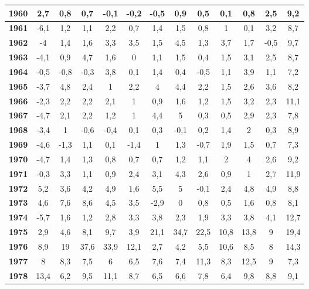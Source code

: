 \begin{center}
\begin{scriptsize}
\begin{longtable}{|c|c|c|c|c|c|c|c|c|c|c|c|c|}
\hline 
\textbf{1960} & 2,7 & 0,8 & 0,7 & -0,1 & -0,2 & -0,5 & 0,9 & 0,5 & 0,1 & 0,8 & 2,5 & 9,2  \\ 
\hline 
\textbf{1961} & -6,1 & 1,2 & 1,1 & 2,2 & 0,7 & 1,4 & 1,5 & 0,8 & 1 & 0,1 & 3,2 & 8,7  \\ 
\hline 
\textbf{1962} & -4 & 1,4 & 1,6 & 3,3 & 3,5 & 1,5 & 4,5 & 1,3 & 3,7 & 1,7 & -0,5 & 9,7  \\ 
\hline 
\textbf{1963} & -4,1 & 0,9 & 4,7 & 1,6 & 0 & 1,1 & 1,5 & 0,4 & 1,5 & 3,1 & 2,5 & 8,7  \\ 
\hline 
\textbf{1964} & -0,5 & -0,8 & -0,3 & 3,8 & 0,1 & 1,4 & 0,4 & -0,5 & 1,1 & 3,9 & 1,1 & 7,2  \\ 
\hline 
\textbf{1965} & -3,7 & 4,8 & 2,4 & 1 & 2,2 & 4 & 4,4 & 2,2 & 1,5 & 2,6 & 3,6 & 8,2  \\ 
\hline 
\textbf{1966} & -2,3 & 2,2 & 2,2 & 2,1 & 1 & 0,9 & 1,6 & 1,2 & 1,5 & 3,2 & 2,3 & 11,1  \\ 
\hline 
\textbf{1967} & -4,7 & 2,1 & 2,2 & 1,2 & 1 & 4,4 & 5 & 0,3 & 0,5 & 2,9 & 2,3 & 7,8  \\ 
\hline 
\textbf{1968} & -3,4 & 1 & -0,6 & -0,4 & 0,1 & 0,3 & -0,1 & 0,2 & 1,4 & 2 & 0,3 & 8,9  \\ 
\hline 
\textbf{1969} & -4,6 & -1,3 & 1,1 & 0,1 & -1,4 & 1 & 1,3 & -0,7 & 1,9 & 1,5 & 0,7 & 7,3  \\ 
\hline 
\textbf{1970} & -4,7 & 1,4 & 1,3 & 0,8 & 0,7 & 0,7 & 1,2 & 1,1 & 2 & 4 & 2,6 & 9,2  \\ 
\hline 
\textbf{1971} & -0,3 & 3,3 & 1,1 & 0,9 & 2,4 & 3,1 & 4,3 & 2,6 & 0,9 & 1 & 2,7 & 11,9  \\ 
\hline 
\textbf{1972} & 5,2 & 3,6 & 4,2 & 4,9 & 1,6 & 5,5 & 5 & -0,1 & 2,4 & 4,8 & 4,9 & 8,8  \\ 
\hline 
\textbf{1973} & 4,6 & 7,6 & 8,6 & 4,5 & 3,5 & -2,9 & 0 & 0,8 & 0,5 & 1,6 & 0,8 & 8,1  \\ 
\hline 
\textbf{1974} & -5,7 & 1,6 & 1,2 & 2,8 & 3,3 & 3,8 & 2,3 & 1,9 & 3,3 & 3,8 & 4,1 & 12,7  \\ 
\hline 
\textbf{1975} & 2,9 & 4,6 & 8,1 & 9,7 & 3,9 & 21,1 & 34,7 & 22,5 & 10,8 & 13,8 & 9 & 19,4  \\ 
\hline 
\textbf{1976} & 8,9 & 19 & 37,6 & 33,9 & 12,1 & 2,7 & 4,2 & 5,5 & 10,6 & 8,5 & 8 & 14,3  \\ 
\hline 
\textbf{1977} & 8 & 8,3 & 7,5 & 6 & 6,5 & 7,6 & 7,4 & 11,3 & 8,3 & 12,5 & 9 & 7,3  \\ 
\hline 
\textbf{1978} & 13,4 & 6,2 & 9,5 & 11,1 & 8,7 & 6,5 & 6,6 & 7,8 & 6,4 & 9,8 & 8,8 & 9,1  \\ 

\end{longtable}
\end{scriptsize}
\end{center}
